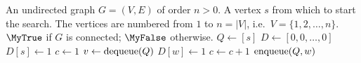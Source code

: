 
\begin{algorithmic}[1]
\Require An undirected graph $G = (V, E)$ of order $n > 0$. A vertex $s$
  from which to start the search. The vertices are numbered from $1$
  to  $n = |V|$, i.e.~$V = \{1, 2, \dots, n\}$.
\Ensure $\MyTrue$ if $G$ is connected; $\MyFalse$ otherwise.
\State $Q \gets [s]$
\State $D \gets [0, 0, \dots, 0]$
\State $D[s] \gets 1$
\State $c \gets 1$
  \State $v \gets \operatorname*{dequeue}(Q)$
      \State $D[w] \gets 1$
      \State $c \gets c + 1$
      \State $\operatorname*{enqueue}(Q, w)$
    \EndIf
  \EndFor
\EndWhile
{}
  \State \Return \MyTrue
\EndIf
\State \Return \MyFalse
\end{algorithmic}
